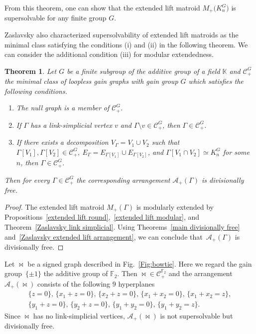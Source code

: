 \documentclass[pdftex]{sigma}
\numberwithin{equation}{section}
\newtheorem{Theorem}{Theorem}[section]
\begin{document}
From this theorem, one can show that the extended lift matroid $ M_{+}\big(K_{n}^{G}\big) $ is supersolvable for any finite group $ G $.

Zaslavsky \cite[Theorem~3.2]{zaslavsky2001supersolvable-ejoc} also characterized supersolvability of extended lift matroids as the minimal class satisfying the conditions (i) and (ii) in the following theorem.
We can consider the additional condition (iii) for modular extendedness.

\begin{Theorem}\label{main extended lift}
Let $ G $ be a finite subgroup of the additive group of a field $ \mathbb{K} $ and $ \mathcal{C}^{G}_{+} $ the minimal class of loopless gain graphs with gain group $ G $ which satisfies the following conditions.
\begin{enumerate}[$(i)$]\itemsep=0pt
\item The null graph is a member of $ \mathcal{C}^{G}_{+} $.
\item If $ \Gamma $ has a link-simplicial vertex $ v $ and $ \Gamma \setminus v \in \mathcal{C}^{G}_{+}$, then $ \Gamma \in \mathcal{C}^{G}_{+} $.
\item If there exists a decomposition $ V_{\Gamma} = V_{1} \cup V_{2} $ such that $ \Gamma[V_{1}], \Gamma[V_{2}] \in \mathcal{C}^{G}_{+}, \ E_{\Gamma} = E_{\Gamma[V_{1}]} \cup E_{\Gamma[V_{2}]} $, and $ \Gamma[V_{1} \cap V_{2}] \simeq K_{n}^{G} $ for some $ n $, then $ \Gamma \in \mathcal{C}^{G}_{+} $.
\end{enumerate}
Then for every $ \Gamma \in \mathcal{C}^{G}_{+} $ the corresponding arrangement $ \mathcal{A}_{+}(\Gamma) $ is divisionally free.
\end{Theorem}
\begin{proof}
The extended lift matroid $ M_{+}(\Gamma) $ is modularly extended by Propositions~\ref{extended lift round},~\ref{extended lift modular}, and Theorem~\ref{Zaslavsky link simplicial}.
Using Theorems~\ref{main divisionally free} and~\ref{Zaslavsky extended lift arrangement}, we can conclude that~$ \mathcal{A}_{+}(\Gamma) $ is divisionally free.
\end{proof}

\begin{Example}Let $ \bowtie $ be a signed graph described in Fig.~\ref{Fig:bowtie}.
Here we regard the gain group~$ \{\pm 1\} $ the additive group of $ \mathbb{F}_{2} $.
Then $ {\bowtie} \in \mathcal{C}^{\mathbb{F}_{2}}_{+} $ and the arrangement $ \mathcal{A}_{+}(\bowtie) $ consists of the following $ 9 $ hyperplanes
\begin{gather*}
\{z=0\},\, \{x_{1}+z=0\}, \,\{x_{2}+z=0\}, \,\{x_{1}+x_{2}=0\}, \,\{x_{1}+x_{2}=z\}, \\
\{y_{1}+z=0\}, \,\{y_{2}+z=0\},\, \{y_{1}+y_{2}=0\},\, \{y_{1}+y_{2}=z\}.
\end{gather*}
Since $ \bowtie $ has no link-simplicial vertices, $ \mathcal{A}_{+}(\bowtie) $ is not supersolvable but divisionally free.
\end{Example}
\end{document}
